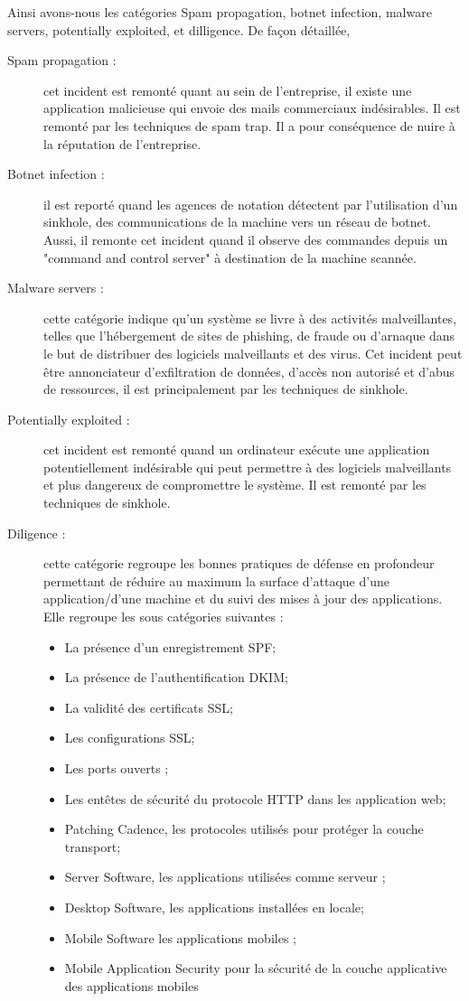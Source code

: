 \documentclass[a4paper,12pt]{book}
\theoremstyle{break}
\begin{document}
Ainsi avons-nous les catégories Spam propagation, botnet infection, malware servers, potentially exploited, et dilligence. 
De façon détaillée, 
\begin{description}
    \item[Spam propagation :]cet incident est remonté quant au sein de l’entreprise, il existe une application malicieuse qui envoie des mails commerciaux indésirables. Il est remonté par les techniques de spam trap. Il a pour conséquence de nuire à la réputation de l’entreprise.  
    \item[Botnet infection :] il est reporté quand les agences de notation détectent par l’utilisation d’un sinkhole, des communications de la machine vers un réseau de botnet. Aussi, il remonte cet incident quand il observe des commandes depuis un "command and control server" à destination de la machine scannée. 
    \item[Malware servers :] cette catégorie indique qu'un système se livre à des activités malveillantes, telles que l'hébergement de sites de phishing, de fraude ou d'arnaque dans le but de distribuer des logiciels malveillants et des virus. Cet incident peut être annonciateur d’exfiltration de données, d’accès non autorisé et d’abus de ressources, il est principalement par les techniques de sinkhole.  
    \item[Potentially exploited :] cet incident est remonté quand un ordinateur exécute une application potentiellement indésirable qui peut permettre à des logiciels malveillants et plus dangereux de compromettre le système. Il est remonté par les techniques de sinkhole.
    \item [Diligence :]cette catégorie regroupe les bonnes pratiques de défense en profondeur permettant de réduire au maximum la surface d’attaque d’une application/d’une machine et du suivi des mises à jour des applications. Elle regroupe les sous catégories suivantes :
    \begin{itemize}
        \item La présence d’un enregistrement \ac{SPF};
        \item La présence de l’authentification \ac{DKIM};
        \item La validité des certificats \ac{SSL};
        \item Les configurations SSL;
        \item Les ports ouverts ;
        \item Les entêtes de sécurité du protocole \ac{HTTP} dans les application web;
        \item Patching Cadence, les protocoles utilisés pour protéger la couche transport;
        \item Server Software, les applications utilisées comme serveur ; 
        \item Desktop Software, les applications installées en locale; 
        \item Mobile Software les applications mobiles ; 
        \item Mobile Application Security pour la sécurité de la couche applicative des applications mobiles 
   


\end{itemize}
\end{description}
\end{document}
